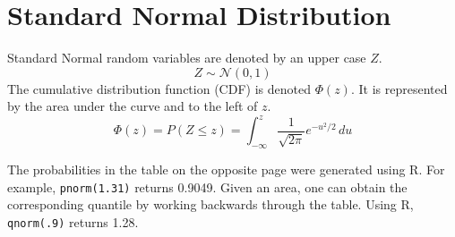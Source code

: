 \appendix
\chapter{Standard Normal Distribution}

Standard Normal random
  variables are denoted by an upper case $Z$. 
  \[ Z \sim \mathcal{N}(0,1) \]
The cumulative distribution function (CDF) is denoted
  $\Phi(z)$. It is represented by the area under the curve and to the
  left of $z$.
  \[
  \Phi(z) = P(Z \leq z) = \int_{-\infty}^z \frac{1}{\sqrt{2\pi}}e^{-u^2/2}\, du
  \]


\begin{center}
\end{center}

The probabilities in the table on the opposite page were generated
using R. For example, \texttt{pnorm(1.31)} returns 0.9049. Given an
area, one can obtain the corresponding quantile by working backwards
through the table. Using R, \texttt{qnorm(.9)} returns 1.28.

